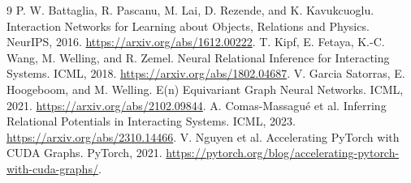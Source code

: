 \documentclass[10pt]{article}
\begin{document}
\begin{thebibliography}{9}
 P. W. Battaglia, R. Pascanu, M. Lai, D. Rezende, and K. Kavukcuoglu. Interaction Networks for Learning about Objects, Relations and Physics. NeurIPS, 2016. \url{https://arxiv.org/abs/1612.00222}.
 T. Kipf, E. Fetaya, K.-C. Wang, M. Welling, and R. Zemel. Neural Relational Inference for Interacting Systems. ICML, 2018. \url{https://arxiv.org/abs/1802.04687}.
 V. Garcia Satorras, E. Hoogeboom, and M. Welling. E(n) Equivariant Graph Neural Networks. ICML, 2021. \url{https://arxiv.org/abs/2102.09844}.
 A. Comas-Massagu\'e et al. Inferring Relational Potentials in Interacting Systems. ICML, 2023. \url{https://arxiv.org/abs/2310.14466}.
 V. Nguyen et al. Accelerating PyTorch with CUDA Graphs. PyTorch, 2021. \url{https://pytorch.org/blog/accelerating-pytorch-with-cuda-graphs/}.
\end{thebibliography}
\end{document}
